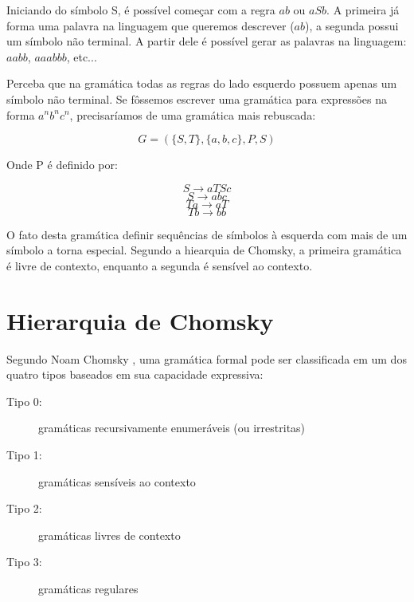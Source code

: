 \documentclass[a4paper,12pt,oneside,onecolumn]{uerj}
\begin{document}
Iniciando do símbolo S, é possível começar com a regra $ab$ ou $aSb$. A primeira já forma uma palavra na linguagem que queremos descrever ($ab$), a segunda possui um símbolo não terminal. A partir dele é possível gerar as palavras na linguagem: $aabb$, $aaabbb$, etc...

Perceba que na gramática todas as regras do lado esquerdo possuem apenas um símbolo não terminal. Se fôssemos escrever uma gramática para expressões na forma $a^nb^nc^n$, precisaríamos de uma gramática mais rebuscada:

\begin{equation*}
	G = (\{S, T\}, \{a,b,c\}, P, S)
\end{equation*}

Onde P é definido por:

\begin{equation*}
	S \rightarrow aTSc
\end{equation*}
\begin{equation*}
	S \rightarrow abc
\end{equation*}
\begin{equation*}
	Ta \rightarrow aT
\end{equation*}
\begin{equation*}
	Tb \rightarrow bb
\end{equation*}

O fato desta gramática definir sequências de símbolos à esquerda com mais de um símbolo a torna especial. Segundo a hiearquia de Chomsky, a primeira gramática é livre de contexto, enquanto a segunda é sensível ao contexto.

\section{Hierarquia de Chomsky}

Segundo Noam Chomsky \cite{bib:Chomsky57}, uma gramática formal pode ser classificada em um dos quatro tipos baseados em sua capacidade expressiva:

\begin{description}
    \item[Tipo 0:] gramáticas recursivamente enumeráveis (ou irrestritas)
    \item[Tipo 1:] gramáticas sensíveis ao contexto
    \item[Tipo 2:] gramáticas livres de contexto
    \item[Tipo 3:] gramáticas regulares
\end{description}
\end{document}
